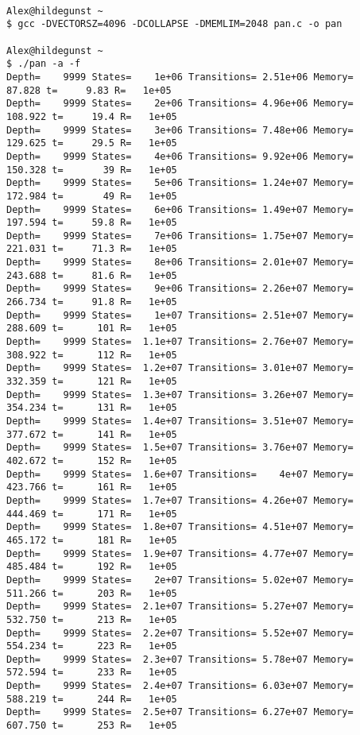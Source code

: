 \documentclass{llncs}
\begin{document}
\begin{lstlisting}[frame=single]

Alex@hildegunst ~
$ gcc -DVECTORSZ=4096 -DCOLLAPSE -DMEMLIM=2048 pan.c -o pan

Alex@hildegunst ~
$ ./pan -a -f
Depth=    9999 States=    1e+06 Transitions= 2.51e+06 Memory=    87.828 t=     9.83 R=   1e+05
Depth=    9999 States=    2e+06 Transitions= 4.96e+06 Memory=   108.922 t=     19.4 R=   1e+05
Depth=    9999 States=    3e+06 Transitions= 7.48e+06 Memory=   129.625 t=     29.5 R=   1e+05
Depth=    9999 States=    4e+06 Transitions= 9.92e+06 Memory=   150.328 t=       39 R=   1e+05
Depth=    9999 States=    5e+06 Transitions= 1.24e+07 Memory=   172.984 t=       49 R=   1e+05
Depth=    9999 States=    6e+06 Transitions= 1.49e+07 Memory=   197.594 t=     59.8 R=   1e+05
Depth=    9999 States=    7e+06 Transitions= 1.75e+07 Memory=   221.031 t=     71.3 R=   1e+05
Depth=    9999 States=    8e+06 Transitions= 2.01e+07 Memory=   243.688 t=     81.6 R=   1e+05
Depth=    9999 States=    9e+06 Transitions= 2.26e+07 Memory=   266.734 t=     91.8 R=   1e+05
Depth=    9999 States=    1e+07 Transitions= 2.51e+07 Memory=   288.609 t=      101 R=   1e+05
Depth=    9999 States=  1.1e+07 Transitions= 2.76e+07 Memory=   308.922 t=      112 R=   1e+05
Depth=    9999 States=  1.2e+07 Transitions= 3.01e+07 Memory=   332.359 t=      121 R=   1e+05
Depth=    9999 States=  1.3e+07 Transitions= 3.26e+07 Memory=   354.234 t=      131 R=   1e+05
Depth=    9999 States=  1.4e+07 Transitions= 3.51e+07 Memory=   377.672 t=      141 R=   1e+05
Depth=    9999 States=  1.5e+07 Transitions= 3.76e+07 Memory=   402.672 t=      152 R=   1e+05
Depth=    9999 States=  1.6e+07 Transitions=    4e+07 Memory=   423.766 t=      161 R=   1e+05
Depth=    9999 States=  1.7e+07 Transitions= 4.26e+07 Memory=   444.469 t=      171 R=   1e+05
Depth=    9999 States=  1.8e+07 Transitions= 4.51e+07 Memory=   465.172 t=      181 R=   1e+05
Depth=    9999 States=  1.9e+07 Transitions= 4.77e+07 Memory=   485.484 t=      192 R=   1e+05
Depth=    9999 States=    2e+07 Transitions= 5.02e+07 Memory=   511.266 t=      203 R=   1e+05
Depth=    9999 States=  2.1e+07 Transitions= 5.27e+07 Memory=   532.750 t=      213 R=   1e+05
Depth=    9999 States=  2.2e+07 Transitions= 5.52e+07 Memory=   554.234 t=      223 R=   1e+05
Depth=    9999 States=  2.3e+07 Transitions= 5.78e+07 Memory=   572.594 t=      233 R=   1e+05
Depth=    9999 States=  2.4e+07 Transitions= 6.03e+07 Memory=   588.219 t=      244 R=   1e+05
Depth=    9999 States=  2.5e+07 Transitions= 6.27e+07 Memory=   607.750 t=      253 R=   1e+05

\end{lstlisting}
\end{document}
